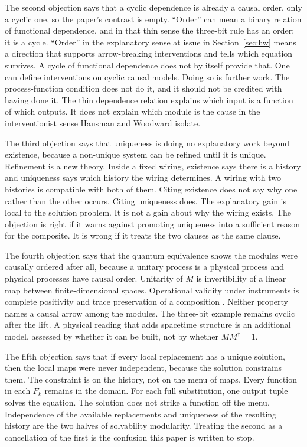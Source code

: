 \documentclass[11pt]{article}
\begin{document}
The second objection says that a cyclic dependence is already a causal order, only a cyclic one, so the paper's contrast is empty. ``Order'' can mean a binary relation of functional dependence, and in that thin sense the three-bit rule has an order: it is a cycle. ``Order'' in the explanatory sense at issue in Section~\ref{sec:hw} means a direction that supports arrow-breaking interventions and tells which equation survives. A cycle of functional dependence does not by itself provide that. One can define interventions on cyclic causal models. Doing so is further work. The process-function condition does not do it, and it should not be credited with having done it. The thin dependence relation explains which input is a function of which outputs. It does not explain which module is the cause in the interventionist sense Hausman and Woodward isolate.

The third objection says that uniqueness is doing no explanatory work beyond existence, because a non-unique system can be refined until it is unique. Refinement is a new theory. Inside a fixed wiring, existence says there is a history and uniqueness says which history the wiring determines. A wiring with two histories is compatible with both of them. Citing existence does not say why one rather than the other occurs. Citing uniqueness does. The explanatory gain is local to the solution problem. It is not a gain about why the wiring exists. The objection is right if it warns against promoting uniqueness into a sufficient reason for the composite. It is wrong if it treats the two clauses as the same clause.

The fourth objection says that the quantum equivalence shows the modules were causally ordered after all, because a unitary process is a physical process and physical processes have causal order. Unitarity of \(M\) is invertibility of a linear map between finite-dimensional spaces. Operational validity under instruments is complete positivity and trace preservation of a composition \citep{oreshkov2012}. Neither property names a causal arrow among the modules. The three-bit example remains cyclic after the lift. A physical reading that adds spacetime structure is an additional model, assessed by whether it can be built, not by whether \(MM^{\dagger}=1\).

The fifth objection says that if every local replacement has a unique solution, then the local maps were never independent, because the solution constrains them. The constraint is on the history, not on the menu of maps. Every function in each \(F_k\) remains in the domain. For each full substitution, one output tuple solves the equation. The solution does not strike a function off the menu. Independence of the available replacements and uniqueness of the resulting history are the two halves of solvability modularity. Treating the second as a cancellation of the first is the confusion this paper is written to stop.
\end{document}
